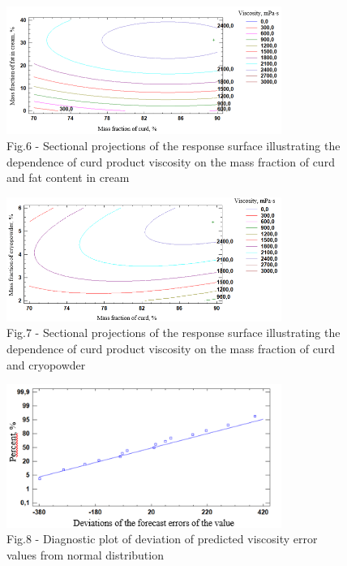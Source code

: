 \begin{figure}[H]
	\centering
	\includegraphics[width=0.8\textwidth]{media/pish2/image86}
	\caption*{Fig.6 - Sectional projections of the response surface illustrating the dependence of curd product viscosity on the mass fraction of curd and fat content in cream}
\end{figure}

\begin{figure}[H]
	\centering
	\includegraphics[width=0.8\textwidth]{media/pish2/image87}
	\caption*{Fig.7 - Sectional projections of the response surface
illustrating the dependence of curd product viscosity on the mass
fraction of curd and cryopowder}
\end{figure}

\begin{figure}[H]
	\centering
	\includegraphics[width=0.8\textwidth]{media/pish2/image88}
	\caption*{Fig.8 - Diagnostic plot of deviation of predicted viscosity
error values from normal distribution}
\end{figure}

